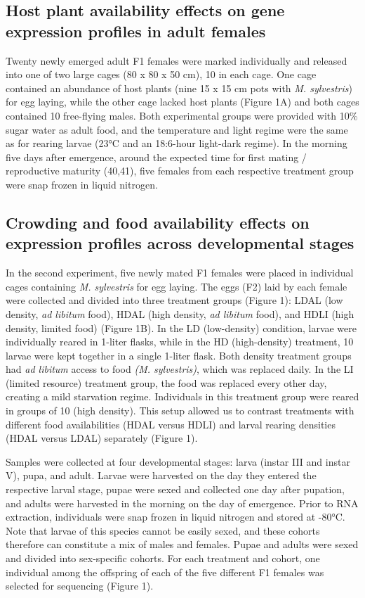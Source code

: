 \documentclass[lineno]{wiley-article}
\begin{document}
\subsection{Host plant availability effects on gene expression profiles in adult females}
Twenty newly emerged adult F1 females were marked individually and released into one of two large cages (80 x 80 x 50 cm), 10 in each cage. One cage contained an abundance of host plants (nine 15 x 15 cm pots with \textit{M. sylvestris}) for egg laying, while the other cage lacked host plants (Figure 1A) and both cages contained 10 free-flying males. Both experimental groups were provided with 10\% sugar water as adult food, and the temperature and light regime were the same as for rearing larvae (23°C and an 18:6-hour light-dark regime). In the morning five days after emergence, around the expected time for first mating / reproductive maturity (40,41), five females from each respective treatment group were snap frozen in liquid nitrogen.

\subsection{Crowding and food availability effects on expression profiles across developmental stages}
In the second experiment, five newly mated F1 females were placed in individual cages containing \textit{M. sylvestris} for egg laying. The eggs (F2) laid by each female were collected and divided into three treatment groups (Figure 1): LDAL (low density, \textit{ad libitum} food), HDAL (high density, \textit{ad libitum} food), and HDLI (high density, limited food) (Figure 1B). In the LD (low-density) condition, larvae were individually reared in 1-liter flasks, while in the HD (high-density) treatment, 10 larvae were kept together in a single 1-liter flask. Both density treatment groups had \textit{ad libitum} access to food \textit{(M. sylvestris)}, which was replaced daily. In the LI (limited resource) treatment group, the food was replaced every other day, creating a mild starvation regime. Individuals in this treatment group were reared in groups of 10 (high density). This setup allowed us to contrast treatments with different food availabilities (HDAL versus HDLI) and larval rearing densities (HDAL versus LDAL) separately (Figure 1). 

Samples were collected at four developmental stages: larva (instar III and instar V), pupa, and adult. Larvae were harvested on the day they entered the respective larval stage, pupae were sexed and collected one day after pupation, and adults were harvested in the morning on the day of emergence. Prior to RNA extraction, individuals were snap frozen in liquid nitrogen and stored at -80°C. Note that larvae of this species cannot be easily sexed, and these cohorts therefore can constitute a mix of males and females. Pupae and adults were sexed and divided into sex-specific cohorts. For each treatment and cohort, one individual among the offspring of each of the five different F1 females was selected for sequencing (Figure 1).
\end{document}
